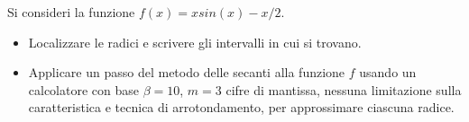 Si consideri la funzione $f(x)=x sin(x)-x/2$.
\begin{itemize}
\item  Localizzare le radici e
scrivere gli intervalli in cui si trovano.
\item Applicare un passo del metodo delle secanti alla funzione $f$
usando un calcolatore con base $\beta =10$, $m=3$ cifre di
mantissa, nessuna limitazione sulla caratteristica e tecnica di
arrotondamento, per approssimare ciascuna radice.
\end{itemize}
